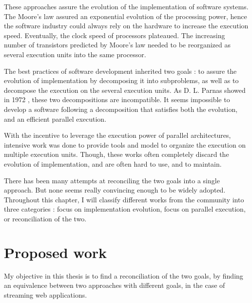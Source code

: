 

These approaches assure the evolution of the implementation of software systems.
The Moore's law \cite{Moore1965} assured an exponential evolution of the processing power, hence the software industry could always rely on the hardware to increase the execution speed.
Eventually, the clock speed of processors plateaued.
The increasing number of transistors predicted by Moore's law needed to be reorganized as several execution units into the same processor.


The best practices of software development inherited two goals : to assure the evolution of implementation by decomposing it into subproblems, as well as to decompose the execution on the several execution units.
As D. L. Parnas showed in 1972 \cite{Parnas1972}, these two decompositions are incompatible.
It seems impossible to develop a software following a decomposition that satisfies both the evolution, and an efficient parallel execution.

With the incentive to leverage the execution power of parallel architectures, 
intensive work was done to provide tools and model to organize the execution on multiple execution units.
Though, these works often completely discard the evolution of implementation, and are often hard to use, and to maintain.

There has been many attempts at reconciling the two goals into a single approach.
But none seems really convincing enough to be widely adopted.
Throughout this chapter, I will classify different works from the community into three categories : focus on implementation evolution, focus on parallel execution, or reconciliation of the two.







\section{Proposed work}

My objective in this thesis is to find a reconciliation of the two goals, by finding an equivalence between two approaches with different goals, in the case of streaming web applications.

